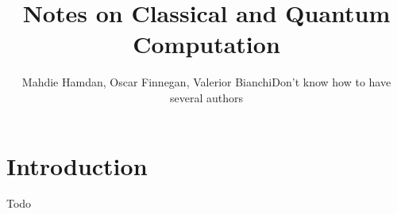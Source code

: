 \documentclass[11pt, tikz]{book}
\begin{document}
\newcommand{\bicatlca}{\operatorname{BicatLCA}}
\newcommand{\born}[1]{\mathcal{#1}}
\newcommand{\topalg}{\operatorname{TopAlg}}
\newcommand{\fm}[1]{\cat{M}_{#1}^{\operatorname{( F)}} }
\newcommand{\res}{\operatorname{Restr}}
\title{Notes on Classical and Quantum Computation}
\author{Mahdie Hamdan, Oscar Finnegan, Valerior Bianchi\red Don't know how to have several authors\black}
\maketitle
\newpage 
\tableofcontents 
\newpage

\chapter{Introduction}

\begin{definition}
\red Todo\black 
\end{definition}
\end{document}

